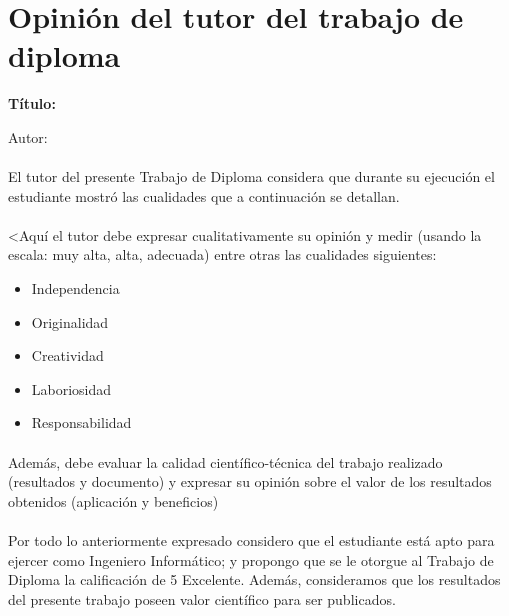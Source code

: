 \clearpage
{} %

\thispagestyle{empty}
\section*{Opinión del tutor del trabajo de diploma}
\textbf{Título: \myTitle}

Autor: \myAuthorName
	
\paragraph{}El tutor del presente Trabajo de Diploma considera que durante su ejecución el estudiante mostró las cualidades que a continuación se detallan.
\paragraph{}<Aquí el tutor debe expresar cualitativamente su opinión y medir (usando la escala: muy alta, alta, adecuada) entre otras las cualidades siguientes: 
\begin{itemize}
	\item Independencia 
	\item Originalidad 
	\item Creatividad             
	\item Laboriosidad 
	\item Responsabilidad
\end{itemize}
	
\paragraph{}Además, debe evaluar la calidad científico-técnica del trabajo realizado (resultados y documento) y expresar su opinión sobre el valor de los resultados obtenidos (aplicación y beneficios)
\paragraph{}Por todo lo anteriormente expresado considero que el estudiante está apto para ejercer como Ingeniero Informático; y propongo que se le otorgue al Trabajo de Diploma la calificación de 5 Excelente. Además, consideramos que los resultados del presente trabajo poseen valor científico para ser publicados.  

